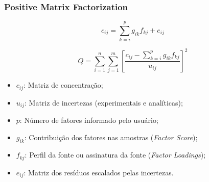 \begin{frame}
	\frametitle{Positive Matrix Factorization}
\begin{equation*}
c_{ij} = \sum_{k=i}^p g_{ik}f_{kj} + e_{ij}
\label{eq:pmf}
\end{equation*}

\begin{equation*}
Q = \sum_{i=1}^n \sum_{j=1}^m  \left[ \frac{c_{ij} - \sum_{k=i}^p g_{ik}f_{kj}} {u_{ij}} \right] ^2
\label{eq:pmfobjectfull}
\end{equation*}

\begin{itemize}
		\item $c_{ij}$: Matriz de concentração;
		\item $u_{ij}$: Matriz de incertezas (experimentais e analíticas);
		\item $p$: Número de fatores informado pelo usuário;
		\item $g_{ik}$: Contribuição dos fatores nas amostras (\textit{Factor Score});
		\item $f_{kj}$: Perfil da fonte ou assinatura da fonte (\textit{Factor Loadings});
		\item $e_{ij}$: Matriz dos resíduos escalados pelas incertezas.

\end{itemize}
\end{frame}
